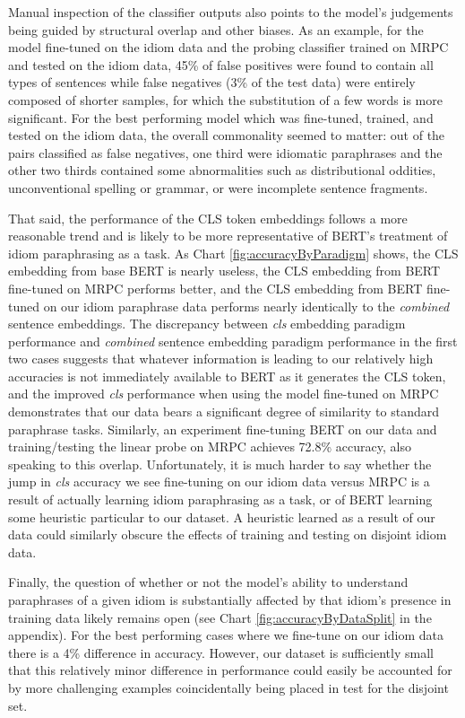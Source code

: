 \documentclass[11pt,a4paper]{article}
\begin{document}
Manual inspection of the classifier outputs also points to the model's judgements being guided by structural overlap and other biases. As an example, for the model fine-tuned on the idiom data and the probing classifier trained on MRPC and tested on the idiom data, 45\% of false positives were found to contain all types of sentences while false negatives (3\% of the test data) were entirely composed of shorter samples, for which the substitution of a few words is more significant. For the best performing model which was fine-tuned, trained, and tested on the idiom data, the overall commonality seemed to matter: out of the pairs classified as false negatives, one third were idiomatic paraphrases and the other two thirds contained some abnormalities such as distributional oddities, unconventional spelling or grammar, or were incomplete sentence fragments.


That said, the performance of the CLS token embeddings follows a more reasonable trend and is likely to be more representative of BERT's treatment of idiom paraphrasing as a task. As Chart \ref{fig:accuracyByParadigm} shows, the CLS embedding from base BERT is nearly useless, the CLS embedding from BERT fine-tuned on MRPC performs better, and the CLS embedding from BERT fine-tuned on our idiom paraphrase data performs nearly identically to the \textit{combined} sentence embeddings. The discrepancy between \textit{cls} embedding paradigm performance and \textit{combined} sentence embedding paradigm performance in the first two cases suggests that whatever information is leading to our relatively high accuracies is not immediately available to BERT as it generates the CLS token, and the improved \textit{cls} performance when using the model fine-tuned on MRPC demonstrates that our data bears a significant degree of similarity to standard paraphrase tasks. Similarly, an experiment fine-tuning BERT on our data and training/testing the linear probe on MRPC achieves 72.8\% accuracy, also speaking to this overlap. Unfortunately, it is much harder to say whether the jump in \textit{cls} accuracy we see fine-tuning on our idiom data versus MRPC is a result of actually learning idiom paraphrasing as a task, or of BERT learning some heuristic particular to our dataset. A heuristic learned as a result of our data could similarly obscure the effects of training and testing on disjoint idiom data.

Finally, the question of whether or not the model's ability to understand paraphrases of a given idiom is substantially affected by that idiom's presence in training data likely remains open (see Chart \ref{fig:accuracyByDataSplit} in the appendix). For the best performing cases where we fine-tune on our idiom data there is a 4\% difference in accuracy. However, our dataset is sufficiently small that this relatively minor difference in performance could easily be accounted for by more challenging examples coincidentally being placed in test for the disjoint set. 
\end{document}
